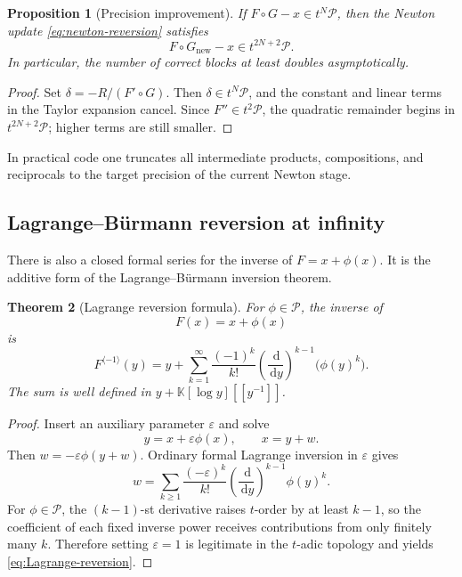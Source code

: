 \documentclass[11pt]{article}
\theoremstyle{pltheorem}
\newtheorem{theorem}{Theorem}[section]
\newtheorem{proposition}[theorem]{Proposition}
\newcommand{\K}{\mathbb K}
\newcommand{\PL}{\mathscr P}
\newcommand{\dd}{\,\mathrm d}
\newcommand{\rev}{\langle-1\rangle}
\newcommand{\compose}{\mathbin{\circ}}
\begin{document}
\begin{proposition}[Precision improvement]\label{prop:newton-reversion-precision}
If \(F\compose G-x\in t^N\PL\), then the Newton update
\cref{eq:newton-reversion} satisfies
\begin{equation}\label{eq:newton-reversion-precision}
 F\compose G_{\mathrm{new}}-x\in t^{2N+2}\PL.
\end{equation}
In particular, the number of correct blocks at least doubles asymptotically.
\end{proposition}

\begin{proof}
Set \(\delta=-R/(F'\compose G)\).  Then \(\delta\in t^N\PL\), and the constant and linear terms in the Taylor expansion cancel.  Since \(F''\in t^2\PL\), the quadratic remainder begins in
\(t^{2N+2}\PL\); higher terms are still smaller.
\end{proof}

In practical code one truncates all intermediate products, compositions, and reciprocals to the target precision of the current Newton stage.

\subsection{Lagrange--B\"urmann reversion at infinity}

There is also a closed formal series for the inverse of \(F=x+\phi(x)\).  It is the additive form of the Lagrange--B\"urmann inversion theorem.

\begin{theorem}[Lagrange reversion formula]\label{thm:Lagrange-reversion}
For \(\phi\in\PL\), the inverse of
\begin{equation}\label{eq:F-x-plus-phi}
 F(x)=x+\phi(x)
\end{equation}
is
\begin{equation}\label{eq:Lagrange-reversion}
 F^{\rev}(y)
 =y+\sum_{k=1}^{\infty}\frac{(-1)^k}{k!}
 \left(\frac{\dd}{\dd y}\right)^{k-1}\!\bigl(\phi(y)^k\bigr).
\end{equation}
The sum is well defined in \(y+\K[\log y][[y^{-1}]]\).
\end{theorem}

\begin{proof}
Insert an auxiliary parameter \(\varepsilon\) and solve
\[
 y=x+\varepsilon\phi(x),
 \qquad x=y+w.
\]
Then \(w=-\varepsilon\phi(y+w)\).  Ordinary formal Lagrange inversion in \(\varepsilon\) gives
\[
 w=\sum_{k\ge1}\frac{(-\varepsilon)^k}{k!}
 \left(\frac{\dd}{\dd y}\right)^{k-1}\phi(y)^k.
\]
For \(\phi\in\PL\), the \((k-1)\)-st derivative raises \(t\)-order by at least \(k-1\), so the coefficient of each fixed inverse power receives contributions from only finitely many \(k\).  Therefore setting \(\varepsilon=1\) is legitimate in the \(t\)-adic topology and yields \cref{eq:Lagrange-reversion}.
\end{proof}
\end{document}
